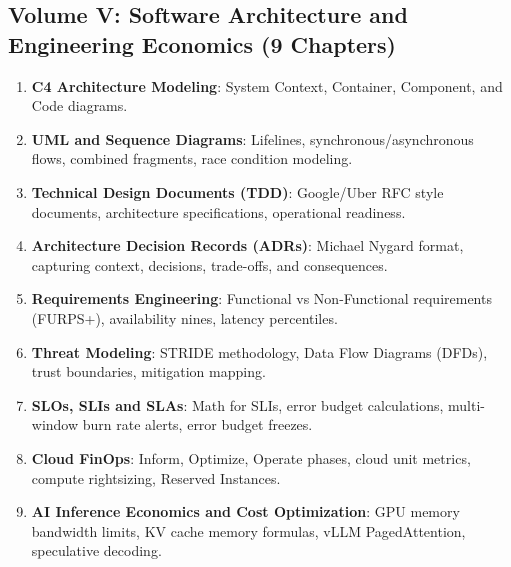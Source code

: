 \documentclass[11pt,oneside]{book}
\begin{document}
\subsection*{Volume V: Software Architecture and Engineering Economics (9 Chapters)}
\begin{enumerate}[leftmargin=18pt]
  \item \textbf{C4 Architecture Modeling}: System Context, Container, Component, and Code diagrams.
  \item \textbf{UML and Sequence Diagrams}: Lifelines, synchronous/asynchronous flows, combined fragments, race condition modeling.
  \item \textbf{Technical Design Documents (TDD)}: Google/Uber RFC style documents, architecture specifications, operational readiness.
  \item \textbf{Architecture Decision Records (ADRs)}: Michael Nygard format, capturing context, decisions, trade-offs, and consequences.
  \item \textbf{Requirements Engineering}: Functional vs Non-Functional requirements (FURPS+), availability nines, latency percentiles.
  \item \textbf{Threat Modeling}: STRIDE methodology, Data Flow Diagrams (DFDs), trust boundaries, mitigation mapping.
  \item \textbf{SLOs, SLIs and SLAs}: Math for SLIs, error budget calculations, multi-window burn rate alerts, error budget freezes.
  \item \textbf{Cloud FinOps}: Inform, Optimize, Operate phases, cloud unit metrics, compute rightsizing, Reserved Instances.
  \item \textbf{AI Inference Economics and Cost Optimization}: GPU memory bandwidth limits, KV cache memory formulas, vLLM PagedAttention, speculative decoding.
\end{enumerate}
\end{document}

